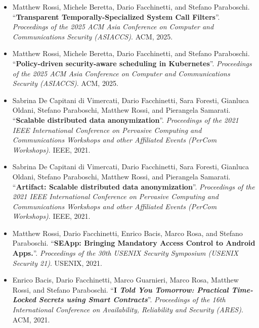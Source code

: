 \begin{itemize}
    \nocite{syscalls}
    \item Matthew Rossi, Michele Beretta, Dario Facchinetti, and
        Stefano Paraboschi. ``\textbf{Transparent
        Temporally-Specialized System Call Filters}''. {\em
        Proceedings of the 2025 ACM Asia Conference on Computer and
        Communications Security (ASIACCS)}. ACM, 2025.

    \nocite{secure-scheduling}
    \item Matthew Rossi, Michele Beretta, Dario Facchinetti, and
        Stefano Paraboschi. ``\textbf{Policy-driven security-aware
        scheduling in Kubernetes}''. {\em Proceedings of the 2025 ACM
        Asia Conference on Computer and Communications Security
        (ASIACCS)}. ACM, 2025.

    \nocite{dffoprs-percom21}
    \item Sabrina De Capitani di Vimercati, Dario Facchinetti, Sara
        Foresti, Gianluca Oldani, Stefano Paraboschi, Matthew Rossi,
        and Pierangela Samarati. ``\textbf{Scalable distributed data
        anonymization}''. {\em Proceedings of the 2021 IEEE
        International Conference on Pervasive Computing and
        Communications Workshops and other Affiliated Events (PerCom
        Workshops)}. IEEE, 2021.
    
    \nocite{dffoprs-percom21-artifact}
    \item Sabrina De Capitani di Vimercati, Dario Facchinetti, Sara
        Foresti, Gianluca Oldani, Stefano Paraboschi, Matthew Rossi,
        and Pierangela Samarati. ``\textbf{Artifact: Scalable
        distributed data anonymization}''. {\em Proceedings of the
        2021 IEEE International Conference on Pervasive Computing and
        Communications Workshops and other Affiliated Events (PerCom
        Workshops)}. IEEE, 2021.

    \nocite{seapp}
    \item Matthew Rossi, Dario Facchinetti, Enrico Bacis, Marco Rosa,
        and Stefano Paraboschi. ``\textbf{SEApp: Bringing Mandatory
        Access Control to Android Apps.}''. {\em Proceedings of the
        30th USENIX Security Symposium (USENIX Security 21)}. USENIX,
        2021.

    \nocite{ityt}
    \item Enrico Bacis, Dario Facchinetti, Marco Guarnieri, Marco
        Rosa, Matthew Rossi, and Stefano Paraboschi. ``\textbf{I \em
        Told You Tomorrow: Practical Time-Locked Secrets using Smart
        Contracts}''. {\em Proceedings of the 16th International
        Conference on Availability, Reliability and Security (ARES)}.
        ACM, 2021.


\end{itemize}
